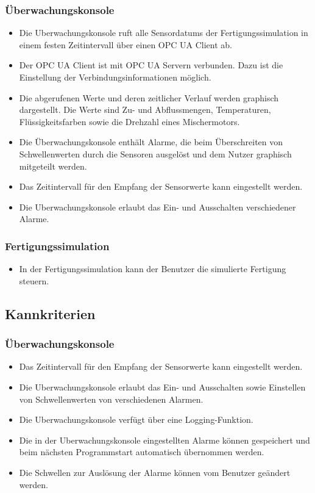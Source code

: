 \documentclass[parskip=full]{scrartcl}
\begin{document}
\subsubsection{Überwachungskonsole}
\begin{itemize}
  \item Die \gls{Uberwachungskonsole} ruft alle \glspl{Sensordatum} der Fertigungssimulation in einem festen Zeitintervall über einen OPC UA Client ab.
  \item Der OPC UA Client ist mit OPC UA Servern verbunden. Dazu ist die Einstellung der Verbindungsinformationen möglich.
  \item Die abgerufenen Werte und deren zeitlicher Verlauf werden graphisch dargestellt. Die Werte sind Zu- und Abflussmengen, Temperaturen, Flüssigkeitsfarben sowie die Drehzahl eines Mischermotors.
  \item Die Überwachungskonsole enthält Alarme, die beim Überschreiten von Schwellenwerten durch die Sensoren ausgelöst und dem Nutzer graphisch mitgeteilt werden.
  \item Das Zeitintervall für den Empfang der Sensorwerte kann eingestellt werden.\item Die \gls{Uberwachungskonsole} erlaubt das Ein- und Ausschalten verschiedener Alarme.
\end{itemize}

\subsubsection{Fertigungssimulation}
\begin{itemize}
  \item In der \gls{Fertigungssimulation} kann der Benutzer die simulierte Fertigung steuern.
\end{itemize}


\subsection{Kannkriterien}
\subsubsection{Überwachungskonsole}
\begin{itemize}
  \item Das Zeitintervall für den Empfang der Sensorwerte kann eingestellt werden.
  \item Die \gls{Uberwachungskonsole} erlaubt das Ein- und Ausschalten sowie Einstellen von Schwellenwerten von verschiedenen Alarmen.
  \item Die \gls{Uberwachungskonsole} verfügt über eine Logging-Funktion.
  \item Die in der \gls{Uberwachungskonsole} eingestellten Alarme k\"onnen gespeichert und beim n\"achsten Programmstart automatisch
    \"ubernommen werden.
  \item Die Schwellen zur Ausl\"osung der Alarme k\"onnen vom Benutzer ge\"andert werden.
\end{itemize}
\end{document}
